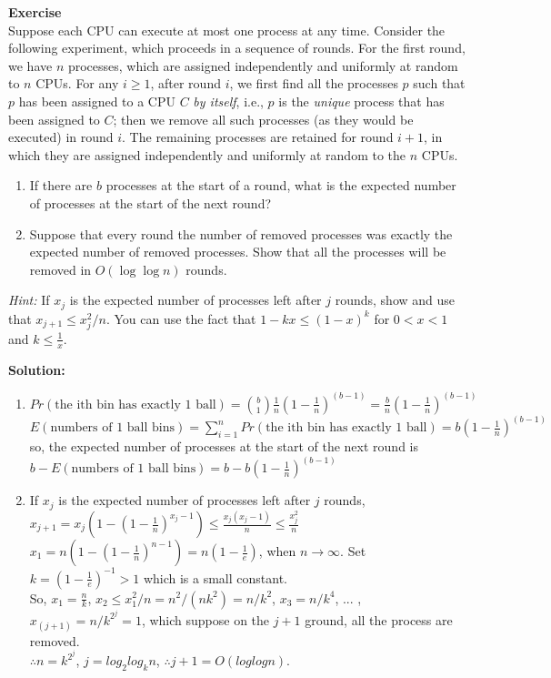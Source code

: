 \documentclass[a4paper,10pt]{article}
\newcounter{aufgc}
\newenvironment{exercise}[1]%
{\refstepcounter{aufgc}\textbf{Exercise \arabic{aufgc}} \emph{#1}\\}
{
	
	\hrulefill\medskip}%
\begin{document}
\begin{exercise}{}

	Suppose each CPU can execute at most one process at any time. Consider the following experiment, which proceeds in a sequence of rounds. For the first round, we have $n$ processes, which are assigned independently and uniformly at random to $n$ CPUs. For any $i\geq 1$, after round $i$, we first find all the processes $p$ such that $p$ has been assigned to a CPU $C$ \emph{by itself}, i.e., $p$ is the \emph{unique} process that has been assigned to $C$; then we remove all such processes (as they would be executed) in round $i$. The remaining processes are retained for round $i+1$, in which they are assigned independently and uniformly at random to the $n$ CPUs.
	\begin{enumerate}
		\item If there are $b$ processes at the start of a round, what is the expected number of processes at the start of the next round?

		      \vspace{0.5em}
		\item Suppose that every round the number of removed processes was exactly the expected number of removed processes. Show that all the processes will be removed in $O(\log\log n)$ rounds.

	\end{enumerate}

	\textit{Hint:} If $x_j$ is the expected number of processes left after $j$ rounds, show and use that $x_{j+1}\leq x_j^2/n$. You can use the fact that $1-kx\leq (1-x)^k$ for $0<x<1$ and $k\leq \frac{1}{x}$.

	\hrulefill

	\textbf{Solution:}
	\begin{enumerate}
		\item $Pr(\text{the ith bin has exactly 1 ball}) = \binom{b}{1}\frac{1}{n}(1-\frac{1}{n})^{(b-1)} = \frac{b}{n}(1-\frac{1}{n})^{(b-1)}$ \\
		      $E(\text{numbers of 1 ball bins}) = \sum_{i=1}^{n} Pr(\text{the ith bin has exactly 1 ball}) = b(1-\frac{1}{n})^{(b-1)}$ \\
		      so, the expected number of processes at the start of the next round is $b - E(\text{numbers of 1 ball bins}) = b-b(1-\frac{1}{n})^{(b-1)}$
		\item If $x_j$ is the expected number of processes left after $j$ rounds, $x_{j+1} = x_{j}(1-(1-\frac{1}{n})^{x_{j}-1}) \le \frac{x_{j} (x_{j}-1)}{n} \le \frac{x_{j}^2}{n}$ \\
		      $x_1 = n(1-(1-\frac{1}{n})^{n-1}) = n(1-\frac{1}{e})$, when $n \to \infty$. Set $k=(1-\frac{1}{e})^{-1} > 1$ which is a small constant. \\
		      So, $x_1=\frac{n}{k}$, $x_2 \le x_1^2/n = n^2/(nk^2) = n/k^2$, $x_3 = n/k^4$, ... , $x_(j+1) = n/k^{2^j} = 1$, which suppose on the $j+1$ ground, all the process are removed. \\
		      $\therefore n=k^{2^j}$, $j = log_2log_kn$, $\therefore j+1 = O(loglogn)$.
	\end{enumerate}

\end{exercise}
\end{document}
